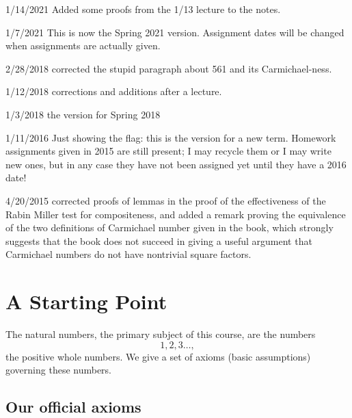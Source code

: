 \documentclass[12pt]{article}
\begin{document}
1/14/2021  Added some proofs from the 1/13 lecture to the notes.

1/7/2021 This is now the Spring 2021 version.  Assignment dates will be changed when assignments are actually given.

2/28/2018 corrected the stupid paragraph about 561 and its Carmichael-ness.

1/12/2018 corrections and additions after a lecture.

1/3/2018 the version for Spring 2018

1/11/2016  Just showing the flag:  this is the version for a new term.  Homework assignments given in 2015 are still present; I may recycle them or I may write new ones, but in any case they have not been assigned yet until they have a 2016 date!

4/20/2015 corrected proofs of lemmas in the proof of the effectiveness of the Rabin Miller test for compositeness, and added a remark proving the equivalence of the two definitions of Carmichael number given in the book, which strongly suggests that the book does not succeed in giving a useful argument that Carmichael numbers do not have nontrivial square factors.

\tableofcontents

\newpage

\section{A Starting Point}

The natural numbers, the primary subject of this course, are the numbers $$1,2,3\ldots, $$  the positive whole numbers.
We give a set of axioms (basic assumptions) governing these numbers.

\subsection{Our official axioms}
\end{document}
